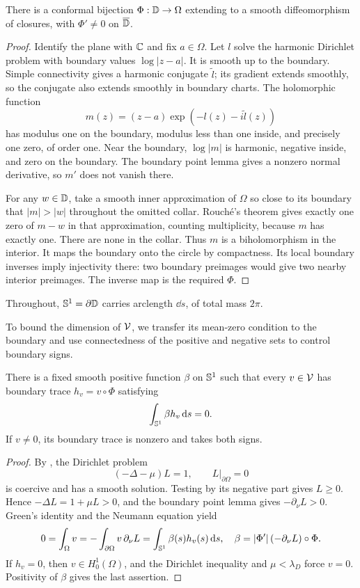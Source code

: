 \begin{lemma}\label{lem:conformal}
There is a conformal bijection $\Phi:\mathbb D\to\Omega$ extending to a smooth diffeomorphism of closures, with $\Phi'\ne0$ on $\overline{\mathbb D}$.
\end{lemma}
\begin{proof}
Identify the plane with $\mathbb C$ and fix $a\in\Omega$. Let $l$ solve the harmonic Dirichlet problem with boundary values $\log|z-a|$. It is smooth up to the boundary. Simple connectivity gives a harmonic conjugate $\widetilde l$; its gradient extends smoothly, so the conjugate also extends smoothly in boundary charts. The holomorphic function
\[
m(z)=(z-a)\exp(-l(z)-i\widetilde l(z))
\]
has modulus one on the boundary, modulus less than one inside, and precisely one zero, of order one. Near the boundary, $\log|m|$ is harmonic, negative inside, and zero on the boundary. The boundary point lemma gives a nonzero normal derivative, so $m'$ does not vanish there.

For any $w\in\mathbb D$, take a smooth inner approximation of $\Omega$ so close to its boundary that $|m|>|w|$ throughout the omitted collar. Rouch\'e's theorem gives exactly one zero of $m-w$ in that approximation, counting multiplicity, because $m$ has exactly one. There are none in the collar. Thus $m$ is a biholomorphism in the interior. It maps the boundary onto the circle by compactness. Its local boundary inverses imply injectivity there: two boundary preimages would give two nearby interior preimages. The inverse map is the required $\Phi$.
\end{proof}

Throughout, $\mathbb S^1=\partial\mathbb D$ carries arclength $\dd s$, of total mass $2\pi$.

To bound the dimension of $\mathcal V$, we transfer its mean-zero condition to the boundary and use connectedness of the positive and negative sets to control boundary signs.

\begin{lemma}\label{lem:boundary-weight}
There is a fixed smooth positive function $\beta$ on $\mathbb S^1$ such that every $v\in\mathcal V$ has boundary trace $h_v=v\circ\Phi$ satisfying
\[
\int_{\mathbb S^1}\beta h_v\,\mathrm d s=0.
\]
If $v\ne0$, its boundary trace is nonzero and takes both signs.
\end{lemma}
\begin{proof}
By , the Dirichlet problem
\[
(-\Delta-\mu)L=1,\qquad L|_{\partial\Omega}=0
\]
is coercive and has a smooth solution. Testing by its negative part gives $L\ge0$. Hence $-\Delta L=1+\mu L>0$, and the boundary point lemma gives $-\partial_\nu L>0$. Green's identity and the Neumann equation yield
\[
0=\int_\Omega v=-\int_{\partial\Omega}v\,\partial_\nu L
=\int_{\mathbb S^1}\beta(s)h_v(s)\,\mathrm d s,
\quad
\beta=|\Phi'|\,(-\partial_\nu L)\circ\Phi.
\]
If $h_v=0$, then $v\in H^1_0(\Omega)$, and the Dirichlet inequality and $\mu<\lambda_D$ force $v=0$. Positivity of $\beta$ gives the last assertion.
\end{proof}

